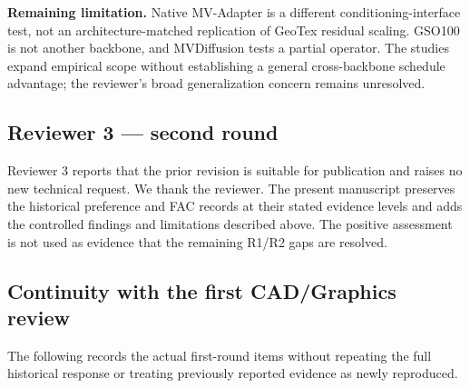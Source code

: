 \documentclass[
  10pt,
]{article}
\begin{document}
\textbf{Remaining limitation.} Native MV-Adapter is a different
conditioning-interface test, not an architecture-matched replication of
GeoTex residual scaling. GSO100 is not another backbone, and MVDiffusion
tests a partial operator. The studies expand empirical scope without
establishing a general cross-backbone schedule advantage; the reviewer's
broad generalization concern remains unresolved.

\hypertarget{reviewer-3-second-round}{%
\subsection{Reviewer 3 --- second round}\label{reviewer-3-second-round}}

Reviewer 3 reports that the prior revision is suitable for publication
and raises no new technical request. We thank the reviewer. The present
manuscript preserves the historical preference and FAC records at their
stated evidence levels and adds the controlled findings and limitations
described above. The positive assessment is not used as evidence that
the remaining R1/R2 gaps are resolved.

\hypertarget{continuity-with-the-first-cadgraphics-review}{%
\subsection{Continuity with the first CAD/Graphics
review}\label{continuity-with-the-first-cadgraphics-review}}

The following records the actual first-round items without repeating the
full historical response or treating previously reported evidence as
newly reproduced.
\end{document}
